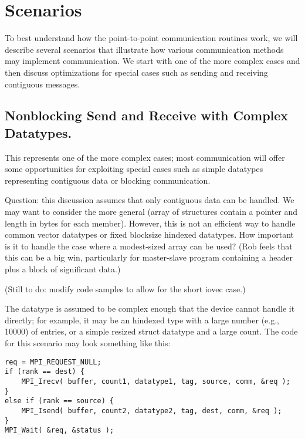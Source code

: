 \newif\ifcodefirst
\codefirstfalse

\section{Scenarios}
\label{sec:pt-2-pt-scenarios}

To best understand how the point-to-point communication routines work, we will
describe several scenarios that illustrate how various communication methods
may implement communication.  We start with one of the more complex cases and
then discuss optimizations for special cases such as sending and receiving
contiguous messages.

\subsection{Nonblocking Send and Receive with Complex Datatypes.}
This represents one of the more complex cases; most communication will offer
some opportunities for exploiting special cases such as simple datatypes
representing contiguous data or blocking communication.  

Question: this discussion assumes that only contiguous data can be handled.
We may want to consider the more general  (array of structures
contain a pointer and length in bytes for each member).  However, this is not
an efficient way to handle common vector datatypes or fixed blocksize hindexed
datatypes.  How important is it to handle the case where a modest-sized
 array can be used?  (Rob feels that this can be a big
win, particularly for master-slave program containing a header plus a
block of significant data.)

(Still to do: modify code samples to allow for the short iovec case.)

The datatype is assumed to be complex enough that the device cannot handle it
directly; for example, it may be an hindexed type with a large number (e.g.,
10000) of entries, or a simple resized struct datatype and a large count.
The code for this scenario may look something like this:
\begin{verbatim}
req = MPI_REQUEST_NULL;
if (rank == dest) {
    MPI_Irecv( buffer, count1, datatype1, tag, source, comm, &req );
}
else if (rank == source) {
    MPI_Isend( buffer, count2, datatype2, tag, dest, comm, &req );
}
MPI_Wait( &req, &status );
\end{verbatim}


